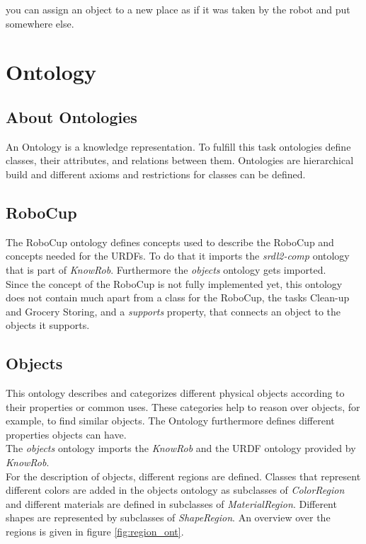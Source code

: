 \documentclass[main.tex]{subfiles}
\begin{document}
you can assign an object to a new place as if it was taken by the robot and put somewhere else.

\section{Ontology}
\subsection{About Ontologies}
An Ontology is a knowledge representation. To fulfill this task ontologies define classes, their attributes, and relations between them. Ontologies are hierarchical build and different axioms and restrictions for classes can be defined.


\subsection{RoboCup}
The RoboCup ontology defines concepts used to describe the RoboCup and concepts needed for the URDFs. To do that it imports the \textit{srdl2-comp} ontology that is part of \textit{KnowRob}. Furthermore the \textit{objects} ontology gets imported.\\
Since the concept of the RoboCup is not fully implemented yet, this ontology does not contain much apart from a class for the RoboCup, the tasks Clean-up and Grocery Storing, and a \textit{supports} property, that connects an object to the objects it supports.

\subsection{Objects}

This ontology describes and categorizes different physical objects according to their properties or common uses. These categories help to reason over objects, for example, to find similar objects. The Ontology furthermore defines different properties objects can have. \\
The \textit{objects} ontology imports the \textit{KnowRob} and the URDF ontology provided by \textit{KnowRob}.\\
For the description of objects, different regions are defined. Classes that represent different colors are added in the objects ontology as subclasses of \textit{ColorRegion} and different materials are defined in subclasses of \textit{MaterialRegion}. Different shapes are represented by subclasses of \textit{ShapeRegion}. An overview over the regions is given in figure \ref{fig:region_ont}.
\end{document}

